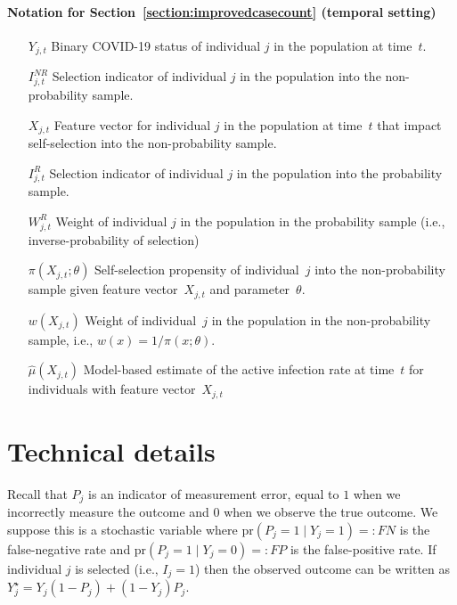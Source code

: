 \documentclass[12pt]{amsart}
\numberwithin{equation}{section}
\theoremstyle{plain}
\def\pr{\text{pr}}
\begin{document}
\paragraph{\bf Notation for Section~\ref{section:improvedcasecount} (temporal setting)}
\begin{itemize}
\item[$Y_{j,t}$] \quad Binary COVID-19 status of individual $j$ in the population at time~$t$.
\item[$I^{NR}_{j,t}$] \quad Selection indicator of individual $j$ in the population into the non-probability sample.
\item[$X_{j,t}$] \quad Feature vector for individual $j$ in the population at time~$t$ that impact self-selection into the non-probability sample.
\item[$I_{j,t}^{R}$] \quad Selection indicator of individual $j$ in the population into the probability sample.
\item[$W_{j,t}^{R}$] \quad Weight of individual $j$ in the population in the probability sample (i.e., inverse-probability of selection)
\item[$\pi (X_{j,t}; \theta)$] \quad Self-selection propensity of individual~$j$ into the non-probability sample given feature vector~$X_{j,t}$ and parameter~$\theta$.
\item[$w (X_{j,t})$] \quad Weight of individual~$j$ in the population in the non-probability sample, i.e., $w(x) = 1/\pi(x; \theta)$.
\item[$\hat \mu(X_{j,t})$] \quad Model-based estimate of the active infection rate at time~$t$ for individuals with feature vector~$X_{j,t}$
\end{itemize}

\section{Technical details}

Recall that $P_j$ is  an indicator of measurement error, equal to $1$ when we incorrectly measure the outcome and $0$ when we observe the true outcome. We suppose this is a stochastic variable where $\pr(P_j = 1 \mid Y_j = 1) =: FN$ is the false-negative rate and $\pr(P_j = 1 \mid Y_j = 0) =: FP$ is the false-positive rate.  If individual $j$ is selected (i.e., $I_j = 1$) then the observed outcome can be written as $Y_j^{\star} = Y_j(1-P_j) + (1-Y_j) P_j$.
\end{document}
